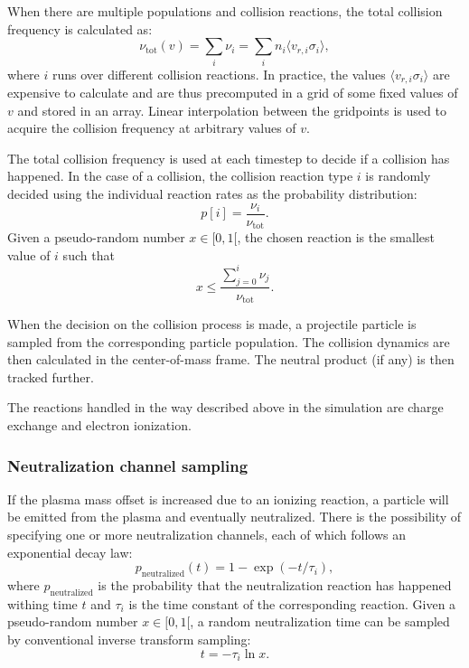\documentclass[a4paper,twoside,12pt]{article}
\begin{document}
When there are multiple populations and collision reactions, the total collision frequency is calculated as:
\begin{equation}
    \nu_\text{tot} (v) = \sum\limits_i \nu_i = \sum\limits_i n_i \langle v_{r, i} \sigma_i \rangle,
\end{equation}
where $i$ runs over different collision reactions.
In practice, the values $\langle v_{r, i} \sigma_i \rangle$ are expensive to calculate and are thus precomputed in a grid of some fixed values of $v$ and stored in an array. Linear interpolation between the gridpoints is used to acquire the collision frequency at arbitrary values of $v$.

The total collision frequency is used at each timestep to decide if a collision has happened. In the case of a collision, the collision reaction type $i$ is randomly decided using the individual reaction rates as the probability distribution:
\begin{equation}
    p[i] = \frac{\nu_i}{\nu_\text{tot}}.
\end{equation}
Given a pseudo-random number $x \in [0, 1[$, the chosen reaction is the smallest value of $i$ such that
\[
    x \leq \frac{\sum\limits_{j=0}^i \nu_j}{\nu_\text{tot}}.
\]

When the decision on the collision process is made, a projectile particle is sampled from the corresponding particle population. The collision dynamics are then calculated in the center-of-mass frame. The neutral product (if any) is then tracked further.

The reactions handled in the way described above in the simulation are charge exchange and electron ionization.

\subsubsection{Neutralization channel sampling}
If the plasma mass offset is increased due to an ionizing reaction, a particle will be emitted from the plasma and eventually neutralized. There is the possibility of specifying one or more neutralization channels, each of which follows an exponential decay law:
\begin{equation}
    p_\text{neutralized}(t) = 1 - \exp(-t / \tau_i ),
\end{equation}
where $p_\text{neutralized}$ is the probability that the neutralization
reaction has happened withing time $t$ and $\tau_i$ is the time constant of the corresponding reaction. Given a pseudo-random number $x \in [0, 1[$, a random neutralization time can be sampled by conventional inverse transform sampling:
\begin{equation}
    t = -\tau_i \ln x.
\end{equation}
\end{document}
